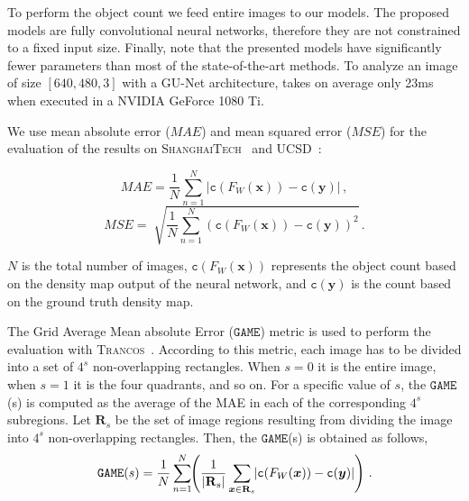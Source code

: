 \documentclass{bmvc2k}
\begin{document}
To perform the object count we feed entire images to our models. The proposed models are fully convolutional neural networks, therefore they are not constrained to a fixed input size. Finally, note that the presented models have significantly fewer parameters than most of the state-of-the-art methods. To analyze an image of size $[640,480,3]$ with a GU-Net architecture, takes on average only 23ms when executed in a NVIDIA GeForce 1080 Ti.

We use mean absolute error ($MAE$) and mean squared error ($MSE$) for the evaluation of the results on \textsc{ShanghaiTech}~\cite{zhang2016} and \textsc{UCSD}~\cite{chan2008}: \vspace{-0.9cm}\begin{multicols}{2}
  \begin{equation}
    MAE = \frac{1}{N} \sum^{N}_{n=1} \left| \mathtt{c}(F_W(\boldsymbol{x})) - \mathtt{c}(\boldsymbol{y})  \right|\, ,
  \end{equation}
  \begin{equation}
    MSE = \sqrt[]{\frac{1}{N} \sum^{N}_{n=1} {\left( \mathtt{c}(F_W(\boldsymbol{x})) - \mathtt{c}(\boldsymbol{y})  \right)}^2}\, .
  \end{equation}
\end{multicols}$N$ is the total number of images, $\mathtt{c}(F_W(\boldsymbol{x}))$ represents the object count based on the density map output of the neural network, and $\mathtt{c}(\boldsymbol{y})$ is the count based on the ground truth density map. 

The Grid Average Mean absolute Error ($\mathtt{GAME}$) metric is used to perform the evaluation with \textsc{Trancos}~\cite{guerrero2015}. According to this metric, each image has to be divided into a set of $4^s$ non-overlapping rectangles. When $s=0$ it is the entire image, when $s=1$ it is the four quadrants, and so on. For a specific value of $s$, the $\mathtt{GAME}$(s) is computed as the average of the MAE in each of the corresponding $4^s$ subregions. Let $\mathbf{R}_{s}$ be the set of image regions resulting from dividing the image into $4^s$ non-overlapping rectangles. Then, the $\mathtt{GAME}$(s) is obtained as follows,
\vspace{-0.25cm}\begin{equation}
\mathtt{GAME}(s) = \frac{1}{N} \sum^{N}_{n=1} \hspace{-1mm} \left( \frac{1}{|\mathbf{R}_s|} \sum_{\boldsymbol{x} \in \mathbf{R}_s} \hspace{-1mm} \left| \mathtt{c}(F_W(\boldsymbol{x})) - \mathtt{c}(\boldsymbol{y})  \right|\right)\, .
\end{equation}
\end{document}
